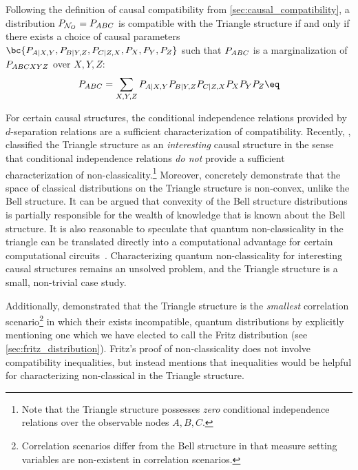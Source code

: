 \documentclass[aps, 10pt, english, twoside, pra, nofootinbib, tightenlines, longbibliography, superscriptaddress]{revtex4-1}
\begin{document}
    Following the definition of causal compatibility from \cref{sec:causal_compatibility}, a distribution $\prob[\nodes_{O}] = \prob[ABC]$ is compatible with the Triangle structure if and only if there exists a choice of causal parameters $\bc{\prob[A|X,Y],\prob[B|Y,Z],\prob[C|Z,X],\prob[X],\prob[Y],\prob[Z]}$ such that
    $\prob[ABC]$ is a marginalization of $\prob[ABCXYZ]$ over $X, Y, Z$:
    \[ \prob[ABC] = \sum_{X,Y,Z}\prob[A|X,Y]\prob[B|Y,Z]\prob[C|Z,X]\prob[X]\prob[Y]\prob[Z] \eq \label{eq:triangle_compatibility} \]

    For certain causal structures, the conditional independence relations provided by $d$-separation relations are a sufficient characterization of compatibility. Recently, \citet{Henson_2014}, classified the Triangle structure as an \textit{interesting} causal structure in the sense that conditional independence relations \textit{do not} provide a sufficient characterization of non-classicality.\footnote{Note that the Triangle structure possesses \textit{zero} conditional independence relations over the observable nodes $A, B, C$.} Moreover, \citet{Inflation} concretely demonstrate that the space of classical distributions on the Triangle structure is non-convex, unlike the Bell structure. It can be argued that convexity of the Bell structure distributions is partially responsible for the wealth of knowledge that is known about the Bell structure. It is also reasonable to speculate that quantum non-classicality in the triangle can be translated directly into a computational advantage for certain computational circuits~\cite{Terhal_2002}. Characterizing quantum non-classicality for interesting causal structures remains an unsolved problem, and the Triangle structure is a small, non-trivial case study.

    Additionally, \citet{Fritz_2012} demonstrated that the Triangle structure is the \textit{smallest} correlation scenario\footnote{Correlation scenarios differ from the Bell structure in that measure setting variables are non-existent in correlation scenarios.} in which their exists incompatible, quantum distributions by explicitly mentioning one which we have elected to call the Fritz distribution (see \cref{sec:fritz_distribution}). Fritz's proof of non-classicality does not involve compatibility inequalities, but instead mentions that inequalities would be helpful for characterizing non-classical in the Triangle structure.
\end{document}
